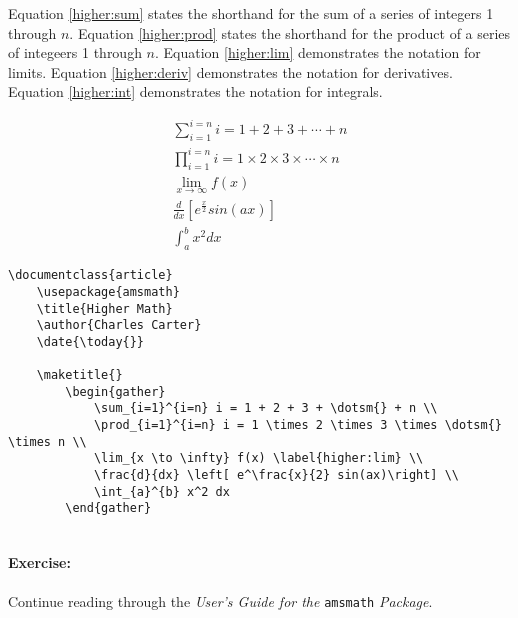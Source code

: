 		Equation \ref{higher:sum} states the shorthand for the sum of a series of integers 1 through $n$. Equation \ref{higher:prod} states the shorthand for the product of a series of integeers 1 through $n$. Equation \ref{higher:lim} demonstrates the notation for limits. Equation \ref{higher:deriv} demonstrates the notation for derivatives. Equation \ref{higher:int} demonstrates the notation for integrals.

        \begin{sample}
		\begin{gather}
			\sum_{i=1}^{i=n} i = 1 + 2 + 3 + \dotsm{} + n \label{higher:sum} \\
			\prod_{i=1}^{i=n} i = 1 \times 2 \times 3 \times \dotsm{} \times n \label{higher:prod} \\
			\lim_{x \to \infty} f(x) \label{higher:lim} \\
			\frac{d}{dx} \left[ e^\frac{x}{2} sin(ax)\right] \label{higher:deriv} \\
			\int_{a}^{b} x^2 dx \label{higher:int}
		\end{gather}
        \end{sample}
		

        \begin{verbatim}
\documentclass{article}
    \usepackage{amsmath}
    \title{Higher Math}
    \author{Charles Carter}
    \date{\today{}}
 
    \maketitle{}
		\begin{gather}
			\sum_{i=1}^{i=n} i = 1 + 2 + 3 + \dotsm{} + n \\
			\prod_{i=1}^{i=n} i = 1 \times 2 \times 3 \times \dotsm{} \times n \\
			\lim_{x \to \infty} f(x) \label{higher:lim} \\
			\frac{d}{dx} \left[ e^\frac{x}{2} sin(ax)\right] \\
			\int_{a}^{b} x^2 dx
		\end{gather}
    
        \end{verbatim}

		\paragraph{Exercise:}Continue reading through the \textit{User's Guide for the }\texttt{amsmath} \textit{Package}.

